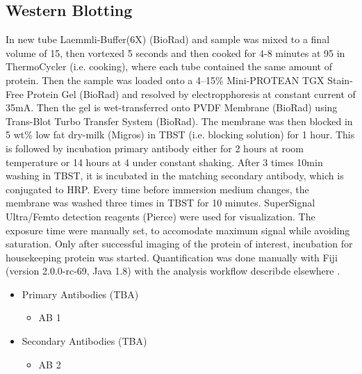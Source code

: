 \subsection{Western Blotting}
In new tube Laemmli-Buffer(6X) (BioRad) and sample was mixed to a final volume of 15\mul{}, then  vortexed 5 seconds and then cooked for 4-8 minutes at 95 \degC in ThermoCycler (i.e. cooking), where each tube contained the same amount of protein. Then the sample was loaded onto a 4–15\% Mini-PROTEAN TGX Stain-Free Protein Gel (BioRad) and resolved by electropphoresis at constant current of 35mA. Then the gel is wet-transferred onto PVDF Membrane (BioRad) using Trans-Blot Turbo Transfer System (BioRad). The membrane was then blocked in 5 wt\% low fat dry-milk (Migros) in TBST (i.e. blocking solution) for 1 hour. This is followed by incubation primary antibody either for 2 hours at room temperature or 14 hours at 4 \degC{} under constant shaking. After 3 times 10min washing in TBST, it is incubated in the matching secondary antibody, which is conjugated to HRP. Every time before immersion medium changes, the membrane was washed three times in TBST for 10 minutes. SuperSignal Ultra/Femto  detection reagents (Pierce) were used for visualization. The exposure time were manually set, to accomodate maximum signal while avoiding saturation. Only after successful imaging of the protein of interest, incubation for housekeeping protein was started. Quantification was done manually with Fiji (version 2.0.0-rc-69, Java 1.8) with the analysis workflow describde elsewhere \cite{Miller2010}.



\begin{itemize}
    \item Primary Antibodies (TBA)
    \begin{itemize}
		\item AB 1
    \end{itemize}

 	\item Secondary Antibodies (TBA)
    \begin{itemize}
		\item AB 2
    \end{itemize}
\end{itemize}


